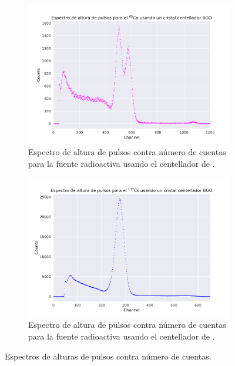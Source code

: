 \documentclass[12pt]{article}
\begin{document}
\begin{figure}[!htb]
\begin{subfigure}{.5\textwidth}
                \label{fig:HeightPulseCsCsI}
            \end{subfigure}%
            \vspace{1cm}
            \begin{subfigure}{.5\textwidth}
                \centering
                \includegraphics[width=\textwidth, trim={1cm 0 1cm 0}, clip]{height_spectrum_BGO_60Co.pdf}
                \caption{Espectro de altura de pulsos contra número de cuentas para la fuente radioactiva  usando el centellador de .}
                \label{fig:HeightPulseCoBGO}
            \end{subfigure}%
            \begin{subfigure}{.5\textwidth}
                \centering
                \includegraphics[width=\textwidth, trim={1cm 0 1cm 0}, clip]{height_spectrum_BGO_137Cs.pdf}
                \caption{Espectro de altura de pulsos contra número de cuentas para la fuente radioactiva  usando el centellador de .}
                \label{fig:HeightPulseCsBGO}
            \end{subfigure}%
            \caption{Espectros de alturas de pulsos contra número de cuentas.}
            \label{fig:heightPulses}
        \end{figure}
\end{document}
